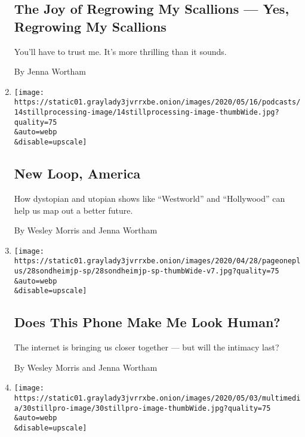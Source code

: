 \begin{enumerate}
  \hypertarget{the-joy-of-regrowing-my-scallions--yes-regrowing-my-scallions}{%
  \subsection{The Joy of Regrowing My Scallions --- Yes, Regrowing My
  Scallions}\label{the-joy-of-regrowing-my-scallions--yes-regrowing-my-scallions}}

  You'll have to trust me. It's more thrilling than it sounds.

  By Jenna Wortham
\item
  \href{/2020/05/14/podcasts/still-processing-westworld-hollywood-utopia-dystopia.html}{}

  \texttt{[image: https://static01.graylady3jvrrxbe.onion/images/2020/05/16/podcasts/14stillprocessing-image/14stillprocessing-image-thumbWide.jpg?quality=75\\\&auto=webp\\\&disable=upscale]}

  \hypertarget{new-loop-america}{%
  \subsection{New Loop, America}\label{new-loop-america}}

  How dystopian and utopian shows like ``Westworld'' and ``Hollywood''
  can help us map out a better future.

  By Wesley Morris and Jenna Wortham
\item
  \href{/2020/05/07/podcasts/still-processing-internet-vulnerability-sondheim-parks-recreation.html}{}

  \texttt{[image: https://static01.graylady3jvrrxbe.onion/images/2020/04/28/pageoneplus/28sondheimjp-sp/28sondheimjp-sp-thumbWide-v7.jpg?quality=75\\\&auto=webp\\\&disable=upscale]}

  \hypertarget{does-this-phone-make-me-look-human}{%
  \subsection{Does This Phone Make Me Look
  Human?}\label{does-this-phone-make-me-look-human}}

  The internet is bringing us closer together --- but will the intimacy
  last?

  By Wesley Morris and Jenna Wortham
\item
  \href{/2020/04/30/podcasts/still-processing-fiona-apple-fetch-bolt-cutters.html}{}

  \texttt{[image: https://static01.graylady3jvrrxbe.onion/images/2020/05/03/multimedia/30stillpro-image/30stillpro-image-thumbWide.jpg?quality=75\\\&auto=webp\\\&disable=upscale]}


\end{enumerate}
